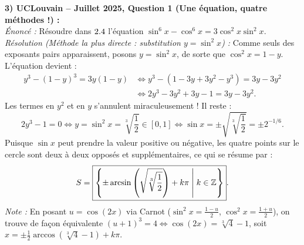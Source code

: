 \begin{exemple}
\begin{center}
\end{center}

\medskip
\textbf{3) UCLouvain -- Juillet 2025, Question 1 (Une équation, quatre méthodes !) :}\\
\emph{Énoncé :} Résoudre dans $2.4$ l'équation $\sin^6 x - \cos^6 x = 3\cos^2 x \sin^2 x$.\\
\emph{Résolution (Méthode la plus directe : substitution $y = \sin^2 x$) :} Comme seuls des exposants pairs apparaissent, posons $y = \sin^2 x$, de sorte que $\cos^2 x = 1 - y$. L'équation devient :
\begin{align*}
    y^3 - (1 - y)^3 = 3y(1 - y) &\iff y^3 - (1 - 3y + 3y^2 - y^3) = 3y - 3y^2 \\
    &\iff 2y^3 - 3y^2 + 3y - 1 = 3y - 3y^2.
\end{align*}
Les termes en $y^2$ et en $y$ s'annulent miraculeusement ! Il reste :
\[
    2y^3 - 1 = 0 \iff y = \sin^2 x = \sqrt[3]{\frac{1}{2}} \in [0, 1] \iff \sin x = \pm \sqrt{\sqrt[3]{\frac{1}{2}}} = \pm 2^{-1/6}.
\]
Puisque $\sin x$ peut prendre la valeur positive ou négative, les quatre points sur le cercle sont deux à deux opposés et supplémentaires, ce qui se résume par :
\[
    S = \boxed{\left\{ \pm\arcsin\left(\sqrt{\sqrt[3]{\frac{1}{2}}}\right) + k\pi \;\middle|\; k \in \mathbb{Z} \right\}}.
\]
\emph{Note :} En posant $u = \cos(2x)$ via Carnot ($\sin^2 x = \frac{1-u}{2}$, $\cos^2 x = \frac{1+u}{2}$), on trouve de façon équivalente $(u+1)^3 = 4 \iff \cos(2x) = \sqrt[3]{4} - 1$, soit $x = \pm\frac{1}{2}\arccos(\sqrt[3]{4}-1) + k\pi$.


\end{exemple}
